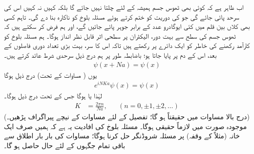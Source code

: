 اب ظاہر ہے کہ کوئی بھی ٹھوس جسم ہمیشہ کے لئے چلتا نہیں جائے گا بلکہ کہیں نہ کہیں اس کی سرحد پائی جائے گی جو  کی دوریت کو ختم کرتے ہوئے مسئلہ بلوخ کو ناکارہ بنا دے گی۔ تاہم کسی بھی کلاں بین قلم میں کئی ایوگادرو عدد کے برابر جوہر پائے جائیں گے، اور ہم فرض کر سکتے ہیں کہ ٹھوس جسم کی سطح سے بہت دور، الیکٹران پر سطحی اثر قابل نظر انداز ہوگا۔ ہم مسئلہ بلوخ کو کارآمد رکھنے کی خاطر  کو ایک دائرے پر رکھتے ہیں تاکہ اس کا سر، بہت بڑی تعداد  دوری فاصلوں کے بعد، اس کے دم پر پایا جاتا ہو؛ باضابطہ طور پر ہم درج ذیل سرحدی شرط عائد کرتے ہیں۔ 
\begin{align}
	\psi(x+Na) = \psi(x)
\end{align}
یوں ( مساوات  کے تحت) درج ذیل ہوگا
\begin{align*}
	e^{iNKa}\psi(x) = \psi(x)
\end{align*}
لہٰذا  یا  ہوگا جس کے تحت درج ذیل ہوگا۔
\begin{align}\label{مساوات_متماثل_مستقلات_قیمتیں}
	K &= \frac{2\pi n}{Na}, &&(n = 0, \pm1, \pm2, \dotsc)
\end{align}
 (درج بالا مساوات میں حقیقتاً  ہو گا؛ تفصیل کے لئے مساوات  کے نیچے پیراگراف پڑھیں۔) موجودہ صورت میں  لازماً حقیقی ہوگا۔ مسئلہ بلوخ کی افادیت یہ ہے کہ ہمیں صرف ایک خانہ (مثلاً  کے وقفہ) پر مسئلہ شروڈنگر حل کرنا ہوگا؛ مساوات  کی بار بار اطلاق سے باقی تمام جگہوں کے لئے حال حاصل ہو گا۔

